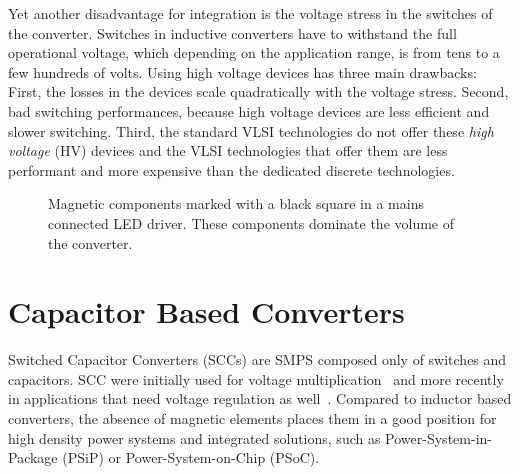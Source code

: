 Yet another disadvantage for integration is the voltage stress in the switches of the converter. Switches in inductive converters have to withstand the full operational voltage, which depending on the application range, is from tens to a few hundreds of volts. Using high voltage devices has three main drawbacks: First, the losses in the devices scale quadratically with the voltage  stress. Second, bad switching performances, because high voltage devices are less efficient and slower switching. Third, the standard VLSI technologies do not offer these \emph{high voltage} (HV) devices and the VLSI technologies that offer them are less performant and more expensive than the dedicated discrete technologies.

\begin{figure}[!h]
\centering
{}
\caption{Magnetic components marked with a black square in a mains connected LED driver. These components dominate the volume of the converter.}
\label{fig:smps_driver}
\end{figure}


\section{Capacitor Based Converters }
Switched Capacitor Converters (SCCs) are SMPS composed only of switches and capacitors. SCC were initially used for voltage multiplication~\cite{30Cockcroft,44Waidelich,76Dickson} and more recently in applications that need voltage regulation as well~\cite{Ng:EECS-2011-94}. Compared to inductor based converters, the absence of magnetic elements places them in a good position for high density power systems and integrated solutions, such as Power-System-in-Package (PSiP) or Power-System-on-Chip (PSoC).

